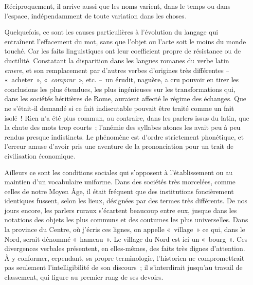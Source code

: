 \documentclass[french,twoside]{book} %
\newcommand{\astermono}{\medskip\centerline{\color{rubric}\large\selectfont{\syms ✻}}\medskip\par}%
\begin{document}
Réciproquement, il arrive aussi que les noms varient, dans le temps ou dans l’espace, indépendamment de toute variation dans les choses.\par
Quelquefois, ce sont les causes particulières à l’évolution du langage qui entraînent l’effacement du mot, sans que l’objet ou l’acte soit le moins du monde touché. Car les faits linguistiques ont leur coefficient propre de résistance ou de ductilité. Constatant la disparition dans les langues romanes du verbe latin \emph{emere}, et son remplacement par d’autres verbes d’origines très différentes – « acheter », « \emph{comprar} », etc. – un érudit, naguère, a cru pouvoir en tirer les conclusions les plus étendues, les plus ingénieuses sur les transformations qui, dans les sociétés héritières de Rome, auraient affecté le régime des échanges. Que ne s’était‑il de­mandé si ce fait indiscutable pouvait être traité comme un fait isolé ! Rien n’a été plus commun, au contraire, dans les parlers issus du latin, que la chute des mots trop courts ; l’anémie des syllabes atones les avait peu à peu rendus presque indistincts. Le phénomène est d’ordre stricte­ment phonétique, et l’erreur amuse d’avoir pris une aventure de la pro­nonciation pour un trait de civilisation économique.\par
Ailleurs ce sont les conditions sociales qui s’opposent à l’établissement ou au maintien d’un vocabulaire uniforme. Dans des sociétés très mor­celées, comme celles de notre Moyen Âge, il était fréquent que des insti­tutions foncièrement identiques fussent, selon les lieux, désignées par des  
\label{p82} termes très différents. De nos jours encore, les parlers ruraux s’écartent beaucoup entre eux, jusque dans les notations des objets les plus communs et des coutumes les plus universelles. Dans la province du Centre, où j’écris ces lignes, on appelle « village » ce qui, dans le Nord, serait dénommé « hameau ». Le village du Nord est ici un « bourg ». Ces divergences ver­bales présentent, en elles‑mêmes, des faits très dignes d’attention. À y conformer, cependant, sa propre terminologie, l’historien ne compro­mettrait pas seulement l’intelligibilité de son discours ; il s’interdirait jusqu’au travail de classement, qui figure au premier rang de ses devoirs.\par

\astermono
\end{document}
